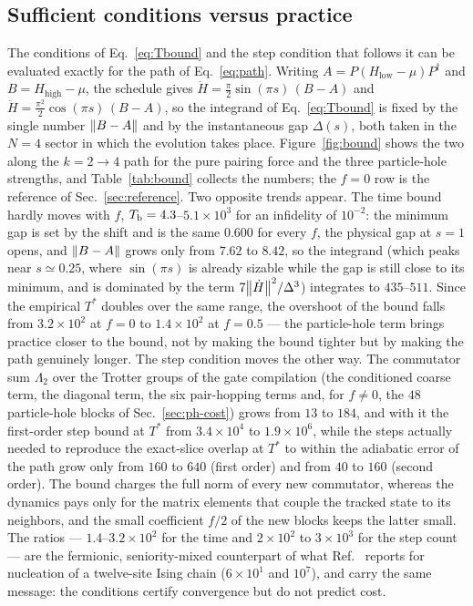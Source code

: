 \documentclass[
  aps,            %
  prc,            %
  reprint,        %
  superscriptaddress,
  floatfix,
  nofootinbib
]{revtex4-2}
\newcommand{\Hlow}{H_{\mathrm{low}}}
\newcommand{\Hhigh}{H_{\mathrm{high}}}
\begin{document}
\subsection{Sufficient conditions versus practice}
\label{sec:ph-bound}
The conditions of Eq.~\eqref{eq:Tbound} and the step condition that follows
it can be evaluated exactly for the path of Eq.~\eqref{eq:path}.  Writing
$A=P(\Hlow-\mu)P^\dagger$ and $B=\Hhigh-\mu$, the schedule gives
$\dot H=\tfrac{\pi}{2}\sin(\pi s)\,(B-A)$ and
$\ddot H=\tfrac{\pi^2}{2}\cos(\pi s)\,(B-A)$, so the integrand of
Eq.~\eqref{eq:Tbound} is fixed by the single number $\norm{B-A}$ and by the
instantaneous gap $\Delta(s)$, both taken in the $N=4$ sector in which the
evolution takes place.  Figure~\ref{fig:bound} shows the two along the
$k=2\to4$ path for the pure pairing force and the three particle-hole
strengths, and Table~\ref{tab:bound} collects the numbers; the $f=0$ row is
the reference of Sec.~\ref{sec:reference}.  Two opposite trends appear.  The
time bound hardly moves with $f$, $T_{\rm b}=4.3$--$5.1\times10^{3}$ for an
infidelity of $10^{-2}$: the minimum gap is set by the shift and is the same
$0.600$ for every $f$, the physical gap at $s=1$ opens, and $\norm{B-A}$
grows only from $7.62$ to $8.42$, so the integrand (which peaks near
$s\simeq0.25$, where $\sin(\pi s)$ is already sizable while the gap is
still close to its minimum, and is dominated by the term
$7\norm{\dot H}^2/\Delta^3$) integrates to $435$--$511$.  Since the empirical
$T^{*}$ doubles over the same range, the overshoot of the bound falls from
$3.2\times10^{2}$ at $f=0$ to $1.4\times10^{2}$ at $f=0.5$ --- the
particle-hole term brings practice closer to the bound, not by making the
bound tighter but by making the path genuinely longer.  The step condition
moves the other way.  The commutator sum $\Lambda_2$ over the Trotter groups
of the gate compilation (the conditioned coarse term, the diagonal term, the
six pair-hopping terms and, for $f\neq0$, the $48$ particle-hole blocks of
Sec.~\ref{sec:ph-cost}) grows from $13$ to $184$, and with it the first-order
step bound at $T^{*}$ from $3.4\times10^{4}$ to $1.9\times10^{6}$, while the
steps actually needed to reproduce the exact-slice overlap at $T^{*}$ to
within the adiabatic error of the path grow only from $160$ to $640$
(first order) and from $40$ to $160$ (second order).  The bound charges the
full norm of every new commutator, whereas the dynamics pays only for the
matrix elements that couple the tracked state to its neighbors, and the
small coefficient $f/2$ of the new blocks keeps the latter small.  The
ratios --- $1.4$--$3.2\times10^{2}$ for the time and $2\times10^{2}$ to
$3\times10^{3}$ for the step count --- are the fermionic, seniority-mixed
counterpart of what Ref.~\cite{Sadia2026} reports for nucleation of a
twelve-site Ising chain ($6\times10^{1}$ and $10^{7}$), and carry the same
message: the conditions certify convergence but do not predict cost.
\end{document}
